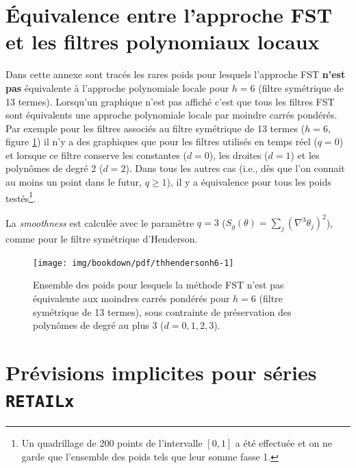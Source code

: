 \documentclass[
  12pt,
  french,
  12pt,a4paper]{article}
\newcommand\1{\mathds{1}}
\begin{document}
\newpage

\hypertarget{an-equivfstlp}{%
\section{Équivalence entre l'approche FST et les filtres polynomiaux locaux}\label{an-equivfstlp}}

Dans cette annexe sont tracés les rares poids pour lesquels l'approche FST \textbf{n'est pas} équivalente à l'approche polynomiale locale pour \(h=6\) (filtre symétrique de 13 termes).
Lorsqu'un graphique n'est pas affiché c'est que tous les filtres FST sont équivalents une approche polynomiale locale par moindre carrés pondérés.
Par exemple pour les filtres associés au filtre symétrique de 13 termes (\(h=6\), figure \ref{fig:thhendersonh6}) il n'y a des graphiques que pour les filtres utilisés en temps réel (\(q=0\)) et lorsque ce filtre conserve les constantes (\(d=0\)), les droites (\(d=1\)) et les polynômes de degré 2 (\(d=2\)).
Dans tous les autres cas (i.e., dès que l'on connait au moins un point dans le futur, \(q\geq 1\)), il y a équivalence pour tous les poids testés\footnote{
  Un quadrillage de 200 points de l'intervalle \([0,1]\) a été effectuée et on ne garde que l'ensemble des poids tels que leur somme fasse 1.}.

La \emph{smoothness} est calculée avec le paramètre \(q=3\) (\(S_g(\theta) = \sum_{j}(\nabla^{3}\theta_{j})^{2}\)), comme pour le filtre symétrique d'Henderson.

\begin{figure}[H]

{\centering \texttt{[image: img/bookdown/pdf/thhendersonh6-1]} 

}

\caption[Ensemble des poids pour lesquels la méthode FST n'est pas équivalente aux moindres carrés pondérés pour \(h=6\) (filtre symétrique de 13 termes), sous contrainte de préservation des polynômes de degré au plus 3 (\(d=0,1,2,3\))]{Ensemble des poids pour lesquels la méthode FST n'est pas équivalente aux moindres carrés pondérés pour \(h=6\) (filtre symétrique de 13 termes), sous contrainte de préservation des polynômes de degré au plus 3 (\(d=0,1,2,3\)).}\label{fig:thhendersonh6}

\footnotesize
\normalsize\end{figure}

\newpage

\hypertarget{an-implicitforecasts}{%
\section{\texorpdfstring{Prévisions implicites pour séries \texttt{RETAILx}}{Prévisions implicites pour séries RETAILx}}\label{an-implicitforecasts}}
\end{document}
